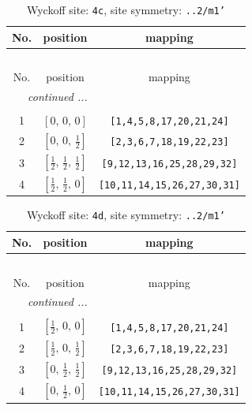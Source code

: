 \documentclass[fleqn,8pt]{jsarticle}
\begin{document}
\renewcommand{\arraystretch}{1.2}
\begin{longtable}{ccc}
\caption{Wyckoff site: {\tt 4c}, site symmetry: {\tt ..2/m1'}}
 \\
 \hline \hline
No. & position & mapping \\ \hline \endfirsthead

\multicolumn{2}{l}{\tablename\ \thetable{}} \\
 \hline \hline
No. & position & mapping \\ \hline \endhead

 \hline \hline
\multicolumn{2}{r}{\footnotesize\it continued ...} \\ \endfoot

 \hline \hline
\multicolumn{2}{r}{} \\ \endlastfoot

1 & $\left[ 0,\, 0,\, 0 \right]$ & {\tt [1,4,5,8,17,20,21,24]} \\ \hline
2 & $\left[ 0,\, 0,\, \frac{1}{2} \right]$ & {\tt [2,3,6,7,18,19,22,23]} \\ \hline
3 & $\left[ \frac{1}{2},\, \frac{1}{2},\, \frac{1}{2} \right]$ & {\tt [9,12,13,16,25,28,29,32]} \\ \hline
4 & $\left[ \frac{1}{2},\, \frac{1}{2},\, 0 \right]$ & {\tt [10,11,14,15,26,27,30,31]} \\
\end{longtable}
\renewcommand{\arraystretch}{1.2}
\begin{longtable}{ccc}
\caption{Wyckoff site: {\tt 4d}, site symmetry: {\tt ..2/m1'}}
 \\
 \hline \hline
No. & position & mapping \\ \hline \endfirsthead

\multicolumn{2}{l}{\tablename\ \thetable{}} \\
 \hline \hline
No. & position & mapping \\ \hline \endhead

 \hline \hline
\multicolumn{2}{r}{\footnotesize\it continued ...} \\ \endfoot

 \hline \hline
\multicolumn{2}{r}{} \\ \endlastfoot

1 & $\left[ \frac{1}{2},\, 0,\, 0 \right]$ & {\tt [1,4,5,8,17,20,21,24]} \\ \hline
2 & $\left[ \frac{1}{2},\, 0,\, \frac{1}{2} \right]$ & {\tt [2,3,6,7,18,19,22,23]} \\ \hline
3 & $\left[ 0,\, \frac{1}{2},\, \frac{1}{2} \right]$ & {\tt [9,12,13,16,25,28,29,32]} \\ \hline
4 & $\left[ 0,\, \frac{1}{2},\, 0 \right]$ & {\tt [10,11,14,15,26,27,30,31]} \\
\end{longtable}
\end{document}
